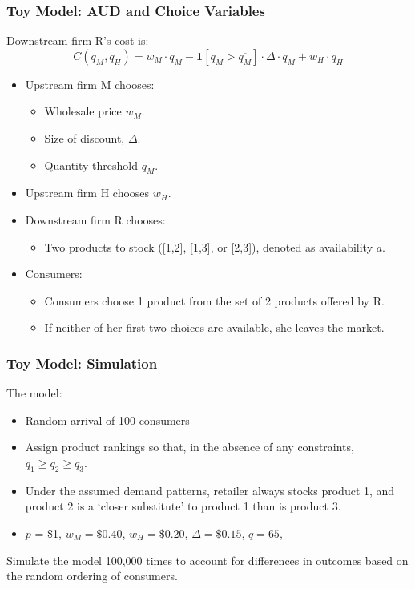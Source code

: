 \begin{frame}
  \frametitle{Toy Model:  AUD and Choice Variables}
\footnotesize
Downstream firm R's cost is:
\begin{equation}
C(q_M,q_H) = w_M \cdot q_M - \mathbf{1}[q_M > \overline{q_M}] \cdot  \Delta \cdot q_M + w_H \cdot q_H
\end{equation}

\begin{itemize}\footnotesize
\item Upstream firm M chooses:
	\begin{itemize}\scriptsize
	\item Wholesale price $w_M$.
	\item Size of discount, $\Delta$.
	\item Quantity threshold $\overline{q_M}$.
	\end{itemize}
\item Upstream firm H chooses $w_H$.
\item Downstream firm R chooses:
	\begin{itemize}\scriptsize
	\item Two products to stock ([1,2], [1,3], or [2,3]), denoted as availability $a$.
	\end{itemize}
\item Consumers:
	\begin{itemize}\scriptsize
	\item Consumers choose 1 product from the set of 2 products offered by R.
	\item If neither of her first two choices are available, she leaves the market.
	\end{itemize}
\end{itemize}
\end{frame}


\begin{frame}
  \frametitle{Toy Model:  Simulation}
\footnotesize
The model:
\begin{itemize}
\item Random arrival of 100 consumers
\item Assign product rankings so that, in the absence of any constraints, $q_1 \geq q_2 \geq q_3$.
\item Under the assumed demand patterns, retailer always stocks product 1, and product 2 is a `closer substitute' to product 1 than is product 3.
\item $p$ = \$1, $w_M = \$0.40$, $w_H = \$0.20$, $\Delta = \$0.15$, $\overline{q} = 65$, 
\end{itemize}
Simulate the model 100,000 times to account for differences in outcomes based on the random ordering of consumers.\\

\end{frame}


